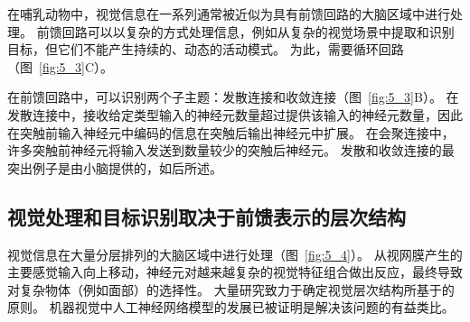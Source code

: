 在哺乳动物中，视觉信息在一系列通常被近似为具有前馈回路的大脑区域中进行处理。
前馈回路可以以复杂的方式处理信息，例如从复杂的视觉场景中提取和识别目标，但它们不能产生持续的、动态的活动模式。
为此，需要循环回路（图~\ref{fig:5_3}C）。


在前馈回路中，可以识别两个子主题：发散连接和收敛连接（图~\ref{fig:5_3}B）。 
在发散连接中，接收给定类型输入的神经元数量超过提供该输入的神经元数量，因此在突触前输入神经元中编码的信息在突触后输出神经元中扩展。
在会聚连接中，许多突触前神经元将输入发送到数量较少的突触后神经元。
发散和收敛连接的最突出例子是由小脑提供的，如后所述。



\subsection{视觉处理和目标识别取决于前馈表示的层次结构}

视觉信息在大量分层排列的大脑区域中进行处理（图~\ref{fig:5_4}）。
从视网膜产生的主要感觉输入向上移动，神经元对越来越复杂的视觉特征组合做出反应，最终导致对复杂物体（例如面部）的选择性。
大量研究致力于确定视觉层次结构所基于的原则。
机器视觉中人工神经网络模型的发展已被证明是解决该问题的有益类比。


